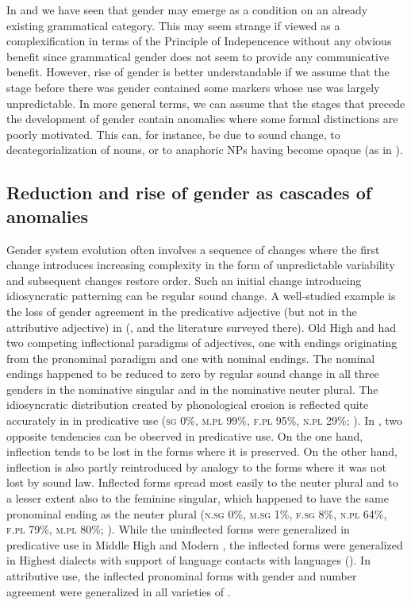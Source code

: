 \documentclass[output=collectionpaper]{langsci/langscibook}
\begin{document}
In  and  we have seen that gender may emerge as a condition on an already existing grammatical category. This may seem strange if viewed as a complexification in terms of the Principle of Indepencence without any obvious benefit since grammatical gender does not seem to provide any communicative benefit. However, rise of gender is better understandable if we assume that the stage before there was gender contained some markers whose use was largely unpredictable. In more general terms, we can assume that the stages that precede the development of gender contain anomalies where some formal distinctions are poorly motivated. This can, for instance, be due to sound change, to decategorialization of nouns, or to anaphoric NPs having become opaque (as in ).

  \subsection{Reduction and rise of gender as cascades of anomalies}
  \label{sec:WDG:10.4}

Gender system evolution often involves a sequence of changes where the first change introduces increasing complexity in the form of unpredictable variability and subsequent changes restore order. Such an initial change introducing idiosyncratic patterning can be regular sound change. A well-studied example is the loss of gender agreement in the predicative adjective (but not in the attributive adjective) in  (\citealt{Fleischer2007a}, \citealt{Fleischer2007b} and the literature surveyed there). Old High  and  had two competing inflectional paradigms of adjectives, one with endings originating from the pronominal paradigm and one with nominal endings. The nominal endings happened to be reduced to zero by regular sound change in all three genders in the nominative singular and in the nominative neuter plural. The idiosyncratic distribution created by phonological erosion is reflected quite accurately in  in predicative use (\textsc{sg} 0\%, \textsc{m.pl} 99\%, \textsc{f.pl} 95\%, \textsc{n.pl} 29\%; \citealt[Table~9]{Fleischer2007a}). In , two opposite tendencies can be observed in predicative use. On the one hand, inflection tends to be lost in the forms where it is preserved. On the other hand, inflection is also partly reintroduced by analogy to the forms where it was not lost by sound law. Inflected forms spread most easily to the neuter plural and to a lesser extent also to the feminine singular, which happened to have the same pronominal ending as the neuter plural (\textsc{n.sg} 0\%, \textsc{m.sg} 1\%, \textsc{f.sg} 8\%, \textsc{n.pl} 64\%, \textsc{f.pl} 79\%, \textsc{m.pl} 80\%; \citealt[Table~11]{Fleischer2007a}). While the uninflected forms were generalized in predicative use in Middle High  and Modern , the inflected forms were generalized in Highest  dialects with support of language contacts with  languages (\citealt{Fleischer2007b}). In attributive use, the inflected pronominal forms with gender and number agreement were generalized in all varieties of .
\end{document}
